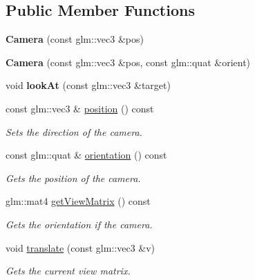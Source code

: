 \subsection*{Public Member Functions}
\begin{DoxyCompactItemize}
\item 
\mbox{\label{class_camera_acee2a1b3d56b0f141a3c6ee82735ed39}} 
{\bfseries Camera} (const glm\+::vec3 \&pos)
\item 
\mbox{\label{class_camera_a9e5dda23dca2ae363424f7a9025f55c9}} 
{\bfseries Camera} (const glm\+::vec3 \&pos, const glm\+::quat \&orient)
\item 
\mbox{\label{class_camera_aec0442093303b9568a159f8c87f8b7d8}} 
void {\bfseries look\+At} (const glm\+::vec3 \&target)
\item 
const glm\+::vec3 \& \mbox{\hyperlink{class_camera_a26f5c28317ec7add2a21ddbdc8e463fb}{position}} () const
\begin{DoxyCompactList}\small\item\em Sets the direction of the camera. \end{DoxyCompactList}\item 
\mbox{\label{class_camera_a872dd113215278493380d19716c63644}} 
const glm\+::quat \& \mbox{\hyperlink{class_camera_a872dd113215278493380d19716c63644}{orientation}} () const
\begin{DoxyCompactList}\small\item\em Gets the position of the camera. \end{DoxyCompactList}\item 
\mbox{\label{class_camera_a2f90e661a78172675ca06ea69667b531}} 
glm\+::mat4 \mbox{\hyperlink{class_camera_a2f90e661a78172675ca06ea69667b531}{get\+View\+Matrix}} () const
\begin{DoxyCompactList}\small\item\em Gets the orientation if the camera. \end{DoxyCompactList}\item 
\mbox{\label{class_camera_aa00429d00bae4984467f9c5d1a3bd158}} 
void \mbox{\hyperlink{class_camera_aa00429d00bae4984467f9c5d1a3bd158}{translate}} (const glm\+::vec3 \&v)
\begin{DoxyCompactList}\small\item\em Gets the current view matrix. \end{DoxyCompactList}\item 

\end{DoxyCompactItemize}
